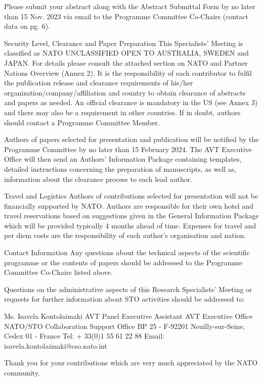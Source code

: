 Please submit your abstract along with the Abstract Submittal Form by no later than 15 Nov. 2023 via email to the Programme Committee Co-Chairs (contact data on pg. 6).


Security Level, Clearance and Paper Preparation
This Specialists’ Meeting is classified as NATO UNCLASSIFIED OPEN TO AUSTRALIA, SWEDEN and JAPAN. For details please consult the attached section on NATO and Partner Nations Overview (Annex 2). It is the responsibility of each contributor to fulfil the publication release and clearance requirements of his/her organization/company/affiliation and country to obtain clearance of abstracts and papers as needed. An official clearance is mandatory in the US (see Annex 3) and there may also be a requirement in other countries. If in doubt, authors should contact a Programme Committee Member.

Authors of papers selected for presentation and publication will be notified by the Programme Committee by no later than 15 February 2024. The AVT Executive Office will then send an Authors’ Information Package containing templates, detailed instructions concerning the preparation of manuscripts, as well as, information about the clearance process to each lead author.



Travel and Logistics
Authors of contributions selected for presentation will not be financially supported by NATO. Authors are responsible for their own hotel and travel reservations based on suggestions given in the General Information Package which will be provided typically 4 months ahead of time. Expenses for travel and per diem costs are the responsibility of each author’s organisation and nation.


Contact Information
Any questions about the technical aspects of the scientific programme or the contents of papers should be addressed to the Programme Committee Co-Chairs listed above.

Questions on the administrative aspects of this Research Specialists’ Meeting or requests for further information about STO activities should be addressed to:

Ms. Isavela Kontolaimaki
AVT Panel Executive Assistant
AVT Executive Office
NATO/STO Collaboration Support Office
BP 25 - F-92201 Neuilly-sur-Seine, Cedex 01 - France
Tel: + 33(0)1 55 61 22 88
Email: isavela.kontolaimaki@cso.nato.int



Thank you for your contributions 
which are very much appreciated by the NATO community.
 

